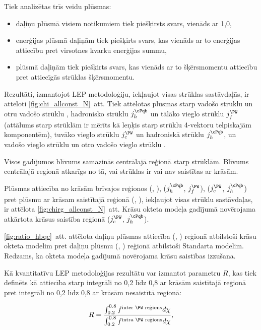 \label{sec:LEP_methodology}

Tiek analizētas trīs veidu plūsmas:
\begin{itemize}
\item daļiņu plūsmā visiem notikumiem tiek piešķirsts svars, vienāds ar 1,0,
\item enerģijas plūsmā daļiņām tiek piešķirts svars, kas vienāds ar to enerģijas attiecību pret virsotnes kvarku enerģijas summu,
\item \pt plūsmā daļiņām tiek piešķirts svars, kas vienāds ar to šķērsmomentu attiecību pret attiecīgās strūklas šķērsmomentu.
\end{itemize}

Rezultāti, izmantojot LEP metodoloģiju, iekļaujot visas strūklas sastāvdaļās, ir attēloti \ref{fig:chi_allconst_N}~att. Tiek attēlotas plūsmas starp vadošo \cPqb strūklu \leadingb un otru vadošo \cPqb strūklu \scndleadingb, hadronisko \cPqb strūklu $j_{h}^{\cPqb}$ un tālāko vieglo strūklu $j_{f}^{\PW}$ (attālums starp strūklām ir mērīts kā leņķis starp strūklu 4-vektoru telpiskajām komponentēm), tuvāko vieglo strūklu $j_{c}^{\PW}$ un hadroniskā \cPqb strūklu $j_{h}^{\cPqb}$, un vadošo vieglo strūklu \leadingjet un otro vadošo vieglo strūklu \scndleadingjet.

Visos gadījumos blīvums samazinās centrālajā reģionā starp strūklām. Blīvums centrālajā regionā atkarīgs no tā, vai strūklas ir vai nav saistītas ar krāsām.

Plūsmas attiecība no krāsām brīvajos reģionos (\leadingb, \scndleadingb), ($j_{h}^{\cPqb}$, $j_{f}^{\PW}$), ($j_{c}^{\PW}$, $j_{h}^{\cPqb}$) pret plūsmu ar krāsam saistītajā reģionā (\leadingjet, \scndleadingjet), iekļaujot visas strūklu sastāvdaļas, ir attēlota \ref{fig:chirg_allconst_N}~att. Krāsu okteta \PW modeļa gadījumā novērojama atkārtota krāsus saistība reģionā ($j_{c}^{\PW}$, $j_{h}^{\cPqb}$).

\ref{fig:ratio_hbqc}~att. attēlota daļiņu plūsmas attiecība (\leadingjet, \scndleadingjet) reģionā atbilstoši krāsu okteta \PW modelim pret daļiņu plūsmu (\leadingjet, \scndleadingjet) reģionā atbilstoši Standarta modelim. Redzams, ka \PW okteta modeļa gadījumā novērojama krāsu saistības izzušana.

Kā kvantitatīvu LEP metodoloģijas rezultātu var izmantot parametru $R$, kas tiek definēts kā attiecība starp integrāli no 0,2 līdz 0,8 ar krāsām saistītajā reģionā pret integrāli no 0,2 līdz 0,8 ar krāsām nesaistītā regionā:

\begin{equation}
R=\frac{\int_{0.2}^{0.8}f^{\text{inter \PW reģions}}d\chi}{\int_{0.2}^{0.8}f^{\text{intra \PW reģions}}d\chi},
\end{equation}

